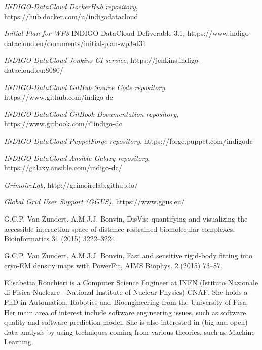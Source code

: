 \documentclass[journal]{IEEEtran}
\begin{document}
\begin{thebibliography}{1}
\emph{INDIGO-DataCloud DockerHub repository},
https://hub.docker.com/u/indigodatacloud

\emph{Initial Plan for WP3} INDIGO-DataCloud Deliverable 3.1,
https://www.indigo-datacloud.eu/documents/initial-plan-wp3-d31

\emph{INDIGO-DataCloud Jenkins CI service},
https://jenkins.indigo-datacloud.eu:8080/

\emph{INDIGO-DataCloud GitHub Source Code repository},
https://www.github.com/indigo-dc

\emph{INDIGO-DataCloud GitBook Documentation repository},
https://www.gitbook.com/@indigo-dc

\emph{INDIGO-DataCloud PuppetForge repository},
https://forge.puppet.com/indigodc

\emph{INDIGO-DataCloud Ansible Galaxy repository},
https://galaxy.ansible.com/indigo-dc/

\emph{GrimoireLab}, http://grimoirelab.github.io/

\emph{Global Grid User Support (GGUS)}, https://www.ggus.eu/

 G.C.P. Van Zundert, A.M.J.J. Bonvin,
DisVis: quantifying and visualizing the accessible interaction space of distance
restrained biomolecular complexes, Bioinformatics 31 (2015) 3222–3224

 G.C.P. Van Zundert, A.M.J.J. Bonvin,
Fast and sensitive rigid-body fitting into cryo-EM density maps with PowerFit,
AIMS Biophys. 2 (2015) 73–87.

\end{thebibliography}

\begin{IEEEbiography} {Elisabetta Ronchieri}
is a Computer Science Engineer at INFN (Istituto Nazionale di Fisica Nucleare - National Institute of Nuclear Physics) CNAF. She holds a PhD in Automation, Robotics and Bioengineering from the University of Pisa. Her main area of interest include software engineering issues, such as software quality and software prediction model. She is also interested in (big and open) data analysis by using techniques coming from various theories, such as Machine Learning.
\end{IEEEbiography}
\end{document}
